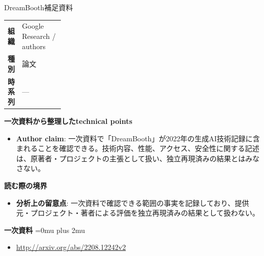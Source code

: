 \begin{technicalnote}{DreamBooth}{補足資料}
\begingroup
\begin{tabularx}{\linewidth}{@{}>{\bfseries}p{0.22\linewidth}X@{}}
組織 & Google Research / authors \\
種別 & 論文 \\
時系列 & — \\
\end{tabularx}
\smallskip
{\bfseries 一次資料から整理したtechnical points}
\begin{itemize}[leftmargin=1.5em,itemsep=0.35em]
\item \textbf{Author claim}: 一次資料で「DreamBooth」が2022年の生成AI技術記録に含まれることを確認できる。技術内容、性能、アクセス、安全性に関する記述は、原著者・プロジェクトの主張として扱い、独立再現済みの結果とはみなさない。
\end{itemize}
\begin{minipage}{\linewidth}
{\bfseries 読む際の境界}
\begin{itemize}[leftmargin=1.5em,itemsep=0.35em]
\item \textbf{分析上の留意点}: 一次資料で確認できる範囲の事実を記録しており、提供元・プロジェクト・著者による評価を独立再現済みの結果として扱わない。
\end{itemize}
\begin{samepage}
{\bfseries 一次資料}
\begingroup\sloppy
\Urlmuskip=0mu plus 2mu\relax
\begin{itemize}[leftmargin=1.5em,itemsep=0.25em]
\item {\scriptsize\url{http://arxiv.org/abs/2208.12242v2}}
\end{itemize}
\endgroup
\end{samepage}
\end{minipage}
\endgroup
\end{technicalnote}
\medskip

